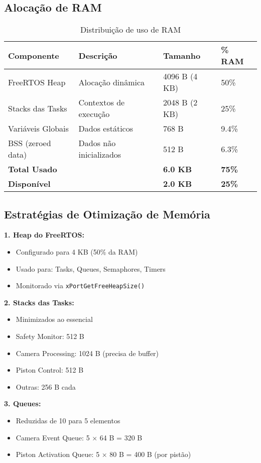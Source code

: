 \documentclass[12pt,a4paper]{article}
\begin{document}
\subsection{Alocação de RAM}

\begin{table}[H]
\centering
\begin{tabularx}{\textwidth}{lXll}
\toprule
\textbf{Componente} & \textbf{Descrição} & \textbf{Tamanho} & \textbf{\% RAM} \\
\midrule
FreeRTOS Heap & Alocação dinâmica & 4096 B (4 KB) & 50\% \\
Stacks das Tasks & Contextos de execução & 2048 B (2 KB) & 25\% \\
Variáveis Globais & Dados estáticos & 768 B & 9.4\% \\
BSS (zeroed data) & Dados não inicializados & 512 B & 6.3\% \\
\midrule
\textbf{Total Usado} & & \textbf{6.0 KB} & \textbf{75\%} \\
\textbf{Disponível} & & \textbf{2.0 KB} & \textbf{25\%} \\
\bottomrule
\end{tabularx}
\caption{Distribuição de uso de RAM}
\end{table}

\subsection{Estratégias de Otimização de Memória}

\textbf{1. Heap do FreeRTOS:}
\begin{itemize}
    \item Configurado para 4 KB (50\% da RAM)
    \item Usado para: Tasks, Queues, Semaphores, Timers
    \item Monitorado via \texttt{xPortGetFreeHeapSize()}
\end{itemize}

\textbf{2. Stacks das Tasks:}
\begin{itemize}
    \item Minimizados ao essencial
    \item Safety Monitor: 512 B
    \item Camera Processing: 1024 B (precisa de buffer)
    \item Piston Control: 512 B
    \item Outras: 256 B cada
\end{itemize}

\textbf{3. Queues:}
\begin{itemize}
    \item Reduzidas de 10 para 5 elementos
    \item Camera Event Queue: 5 × 64 B = 320 B
    \item Piston Activation Queue: 5 × 80 B = 400 B (por pistão)
\end{itemize}
\end{document}
